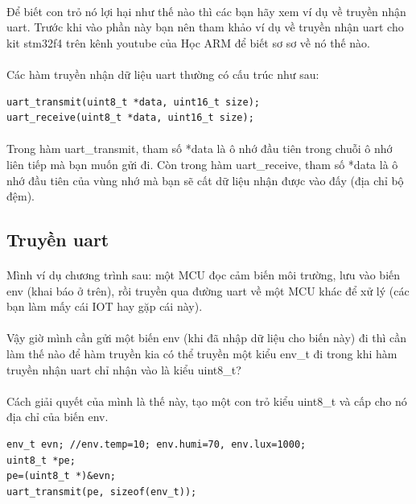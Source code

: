 \documentclass[12pt,a5paper]{book}
\begin{document}
\paragraph{}
Để biết con trỏ nó lợi hại như thế nào thì các bạn hãy xem ví dụ về truyền nhận uart. Trước khi vào phần này bạn nên tham khảo ví dụ về truyền nhận uart cho kit stm32f4 trên kênh youtube của Học ARM để biết sơ sơ về nó thế nào.
\paragraph{}
Các hàm truyền nhận dữ liệu uart thường có cấu trúc như sau:
\begin{lstlisting}
uart_transmit(uint8_t *data, uint16_t size);
uart_receive(uint8_t *data, uint16_t size);
\end{lstlisting}
\paragraph{}
Trong hàm uart\_transmit, tham số *data là ô nhớ đầu tiên trong chuỗi ô nhớ liên tiếp mà bạn muốn gửi đi. Còn trong hàm uart\_receive, tham số *data là ô nhớ đầu tiên của vùng nhớ mà bạn sẽ cất dữ liệu nhận được vào đấy (địa chỉ bộ đệm).
\subsection{Truyền uart}
\paragraph{}
Mình ví dụ chương trình sau: một MCU đọc cảm biến môi trường, lưu vào biến env (khai báo ở trên), rồi truyền qua đường uart về một MCU khác để xử lý (các bạn làm mấy cái IOT hay gặp cái này).

\paragraph{}
Vậy giờ mình cần gửi một biến env (khi đã nhập dữ liệu cho biến này) đi thì cần làm thế nào để hàm truyền kia có thể truyền một kiểu env\_t đi trong khi hàm truyền nhận uart chỉ nhận vào là kiểu uint8\_t?
\paragraph{}
Cách giải quyết của mình là thế này, tạo một con trỏ kiểu uint8\_t và cấp cho nó địa chỉ của biến env.
\begin{lstlisting}
env_t evn; //env.temp=10; env.humi=70, env.lux=1000;
uint8_t *pe;
pe=(uint8_t *)&evn;
uart_transmit(pe, sizeof(env_t));
\end{lstlisting}
\end{document}
